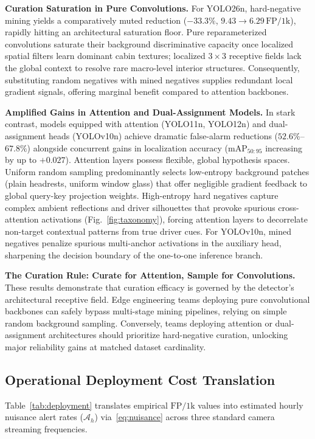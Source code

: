 \documentclass[conference]{IEEEtran}
\begin{document}
\noindent\textbf{Curation Saturation in Pure Convolutions.}
For YOLO26n, hard-negative mining yields a comparatively muted reduction ($-33.3\%$, $9.43 \to 6.29\,\mathrm{FP/1k}$), rapidly hitting an architectural saturation floor. Pure reparameterized convolutions saturate their background discriminative capacity once localized spatial filters learn dominant cabin textures; localized $3 \times 3$ receptive fields lack the global context to resolve rare macro-level interior structures. Consequently, substituting random negatives with mined negatives supplies redundant local gradient signals, offering marginal benefit compared to attention backbones.

\noindent\textbf{Amplified Gains in Attention and Dual-Assignment Models.}
In stark contrast, models equipped with attention (YOLO11n, YOLO12n) and dual-assignment heads (YOLOv10n) achieve dramatic false-alarm reductions ($52.6\%$--$67.8\%$) alongside concurrent gains in localization accuracy ($\mathrm{mAP}_{50:95}$ increasing by up to $+0.027$). Attention layers possess flexible, global hypothesis spaces. Uniform random sampling predominantly selects low-entropy background patches (plain headrests, uniform window glass) that offer negligible gradient feedback to global query-key projection weights. High-entropy hard negatives capture complex ambient reflections and driver silhouettes that provoke spurious cross-attention activations (Fig.~\ref{fig:taxonomy}), forcing attention layers to decorrelate non-target contextual patterns from true driver cues. For YOLOv10n, mined negatives penalize spurious multi-anchor activations in the auxiliary head, sharpening the decision boundary of the one-to-one inference branch.

\noindent\textbf{The Curation Rule: Curate for Attention, Sample for Convolutions.}
These results demonstrate that curation efficacy is governed by the detector's architectural receptive field. Edge engineering teams deploying pure convolutional backbones can safely bypass multi-stage mining pipelines, relying on simple random background sampling. Conversely, teams deploying attention or dual-assignment architectures should prioritize hard-negative curation, unlocking major reliability gains at matched dataset cardinality.

\subsection{Operational Deployment Cost Translation}
\label{subsec:cost_results}
Table~\ref{tab:deployment} translates empirical $\mathrm{FP/1k}$ values into estimated hourly nuisance alert rates ($\mathcal{A}_h$) via~\eqref{eq:nuisance} across three standard camera streaming frequencies.
\end{document}
